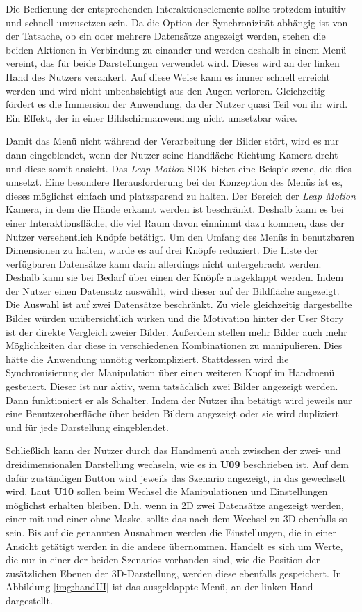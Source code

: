 Die Bedienung der entsprechenden Interaktionselemente sollte trotzdem intuitiv und schnell umzusetzen sein. Da die Option der Synchronizität abhängig ist von der Tatsache, ob ein oder mehrere Datensätze angezeigt werden, stehen die beiden Aktionen in Verbindung zu einander und werden deshalb in einem Menü vereint, das für beide Darstellungen verwendet wird. Dieses wird an der linken Hand des Nutzers verankert. Auf diese Weise kann es immer schnell erreicht werden und wird nicht unbeabsichtigt aus den Augen verloren. Gleichzeitig fördert es die Immersion der Anwendung, da der Nutzer quasi Teil von ihr wird. Ein Effekt, der in einer Bildschirmanwendung nicht umsetzbar wäre. 

Damit das Menü nicht während der Verarbeitung der Bilder stört, wird es nur dann eingeblendet, wenn der Nutzer seine Handfläche Richtung Kamera dreht und diese somit ansieht. Das \textit{Leap Motion} SDK bietet eine Beispielszene, die dies umsetzt.
Eine besondere Herausforderung bei der Konzeption des Menüs ist es, dieses möglichst einfach und platzsparend zu halten. Der Bereich der \textit{Leap Motion} Kamera, in dem die Hände erkannt werden ist beschränkt. Deshalb kann es bei einer Interaktionsfläche, die viel Raum davon einnimmt dazu kommen, dass der Nutzer versehentlich Knöpfe betätigt. 
Um den Umfang des Menüs in benutzbaren Dimensionen zu halten, wurde es auf drei Knöpfe reduziert. 
Die Liste der verfügbaren Datensätze kann darin allerdings nicht untergebracht werden. Deshalb kann sie bei Bedarf über einen der Knöpfe ausgeklappt werden. 
Indem der Nutzer einen Datensatz auswählt, wird dieser auf der Bildfläche angezeigt. Die Auswahl ist auf zwei Datensätze beschränkt. Zu viele gleichzeitig dargestellte Bilder würden unübersichtlich wirken und die Motivation hinter der User Story ist der direkte Vergleich zweier Bilder. Außerdem stellen mehr Bilder auch mehr Möglichkeiten dar diese in verschiedenen Kombinationen zu manipulieren. Dies hätte die Anwendung unnötig verkompliziert. 
Stattdessen wird die Synchronisierung der Manipulation über einen weiteren Knopf im Handmenü gesteuert. Dieser ist nur aktiv, wenn tatsächlich zwei Bilder angezeigt werden. Dann funktioniert er als Schalter. Indem der Nutzer ihn betätigt wird jeweils nur eine Benutzeroberfläche über beiden Bildern angezeigt oder sie wird dupliziert und für jede Darstellung eingeblendet. 
 
Schließlich kann der Nutzer durch das Handmenü auch zwischen der zwei- und dreidimensionalen Darstellung wechseln, wie es in \textbf{U09} beschrieben ist. Auf dem dafür zuständigen Button wird jeweils das Szenario angezeigt, in das gewechselt wird.
Laut \textbf{U10} sollen beim Wechsel die Manipulationen und Einstellungen möglichst erhalten bleiben. D.h. wenn in 2D zwei Datensätze angezeigt werden, einer mit und einer ohne Maske, sollte das nach dem Wechsel zu 3D ebenfalls so sein. 
Bis auf die genannten Ausnahmen werden die Einstellungen, die in einer Ansicht getätigt werden in die andere übernommen. Handelt es sich um Werte, die nur in einer der beiden Szenarios vorhanden sind, wie die Position der zusätzlichen Ebenen der 3D-Darstellung, werden diese ebenfalls gespeichert.
In Abbildung \ref{img:handUI} ist das ausgeklappte Menü, an der linken Hand dargestellt.


